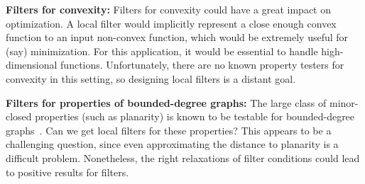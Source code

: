 \documentclass[natbib]{svcyclop}
\begin{document}
{\bf Filters for convexity:} Filters for convexity could have a great impact on optimization.
A local filter would implicitly represent a close enough convex function to an input non-convex function,
which would be extremely useful for (say) minimization. For this application, it would be essential
to handle high-dimensional functions. Unfortunately, there are no known property testers for convexity in this setting,
so designing local filters is a distant goal.

{\bf Filters for properties of bounded-degree graphs:} The large class of minor-closed properties (such as planarity)
is known to be testable for bounded-degree graphs~\cite{BSS08}. Can we get local filters for these properties? This appears to 
be a challenging question, since even approximating the distance to planarity is a difficult problem.
Nonetheless, the right relaxations of filter conditions could lead to positive results for filters.



%
%
%
%


%
%
%
%
%
%


\end{document}
